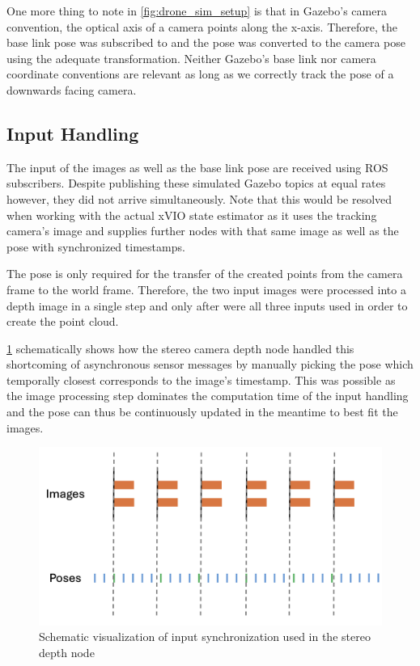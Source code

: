 One more thing to note in \cref{fig:drone_sim_setup} is that in Gazebo's camera convention, the optical axis of a camera points along the x-axis. Therefore, the base link pose was subscribed to and the pose was converted to the camera pose using the adequate transformation. Neither Gazebo's base link nor camera coordinate conventions are relevant as long as we correctly track the pose of a downwards facing camera.

\subsection{Input Handling}
The input of the images as well as the base link pose are received using ROS subscribers. Despite publishing these simulated Gazebo topics at equal rates however, they did not arrive simultaneously. Note that this would be resolved when working with the actual xVIO state estimator as it uses the tracking camera's image and supplies further nodes with that same image as well as the pose with synchronized timestamps.

The pose is only required for the transfer of the created points from the camera frame to the world frame. Therefore, the two input images were processed into a depth image in a single step and only after were all three inputs used in order to create the point cloud. 

\cref{fig:input_synch} schematically shows how the stereo camera depth node handled this shortcoming of asynchronous sensor messages by manually picking the pose which temporally closest corresponds to the image's timestamp. This was possible as the image processing step dominates the computation time of the input handling and the pose can thus be continuously updated in the meantime to best fit the images.

\begin{figure}[h]
\centering
\includegraphics[scale=0.26]{images/stereo_camera_depth/input_synchronization.png}
\caption{Schematic visualization of input synchronization used in the stereo depth node}
\label{fig:input_synch}
\end{figure}
\clearpage %

